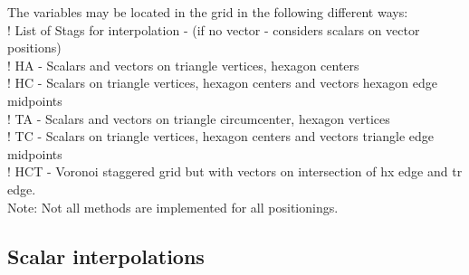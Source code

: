 \documentclass[a4paper,10pt]{article}
\begin{document}
The variables may be located in the grid in the following different ways:\\
  ! List of Stags for interpolation - (if no vector - considers scalars on vector positions)\\
  ! HA  - Scalars and vectors on triangle vertices, hexagon centers\\
  ! HC  - Scalars on triangle vertices, hexagon centers and vectors hexagon edge midpoints\\
  ! TA  - Scalars and vectors on triangle circumcenter, hexagon vertices\\
  ! TC  - Scalars on triangle vertices, hexagon centers and vectors triangle edge midpoints\\
  ! HCT - Voronoi staggered grid but with vectors on intersection of hx edge and tr edge.\\
 
Note: Not all methods are implemented for all positionings.

\subsection{Scalar interpolations}
\end{document}

